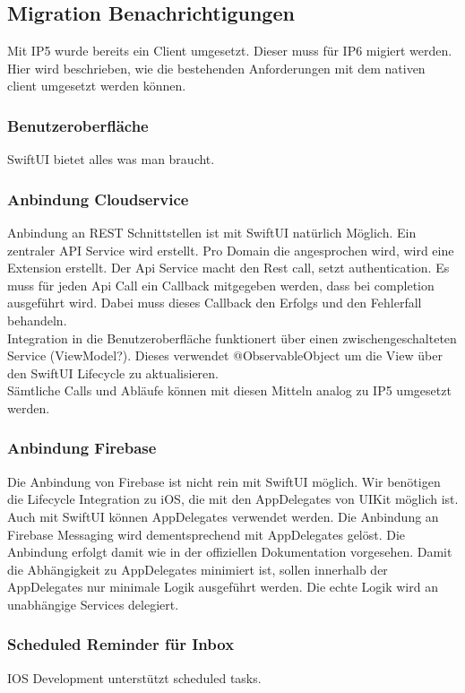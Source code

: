 \subsection{Migration Benachrichtigungen}

Mit IP5 wurde bereits ein Client umgesetzt.
Dieser muss für IP6 migiert werden.
Hier wird beschrieben, wie die bestehenden Anforderungen mit dem nativen client umgesetzt werden können.

\subsubsection*{Benutzeroberfläche}
SwiftUI bietet alles was man braucht.


\subsubsection*{Anbindung Cloudservice}
Anbindung an REST Schnittstellen ist mit SwiftUI natürlich Möglich.
Ein zentraler API Service wird erstellt.
Pro Domain die angesprochen wird, wird eine Extension erstellt.
Der Api Service macht den Rest call, setzt authentication.
Es muss für jeden Api Call ein Callback mitgegeben werden, dass bei completion ausgeführt wird.
Dabei muss dieses Callback den Erfolgs und den Fehlerfall behandeln. \\

Integration in die Benutzeroberfläche funktionert über einen zwischengeschalteten Service (ViewModel?).
Dieses verwendet @ObservableObject um die View über den SwiftUI Lifecycle zu aktualisieren. \\

Sämtliche Calls und Abläufe können mit diesen Mitteln analog zu IP5 umgesetzt werden.


\subsubsection*{Anbindung Firebase}

Die Anbindung von Firebase ist nicht rein mit SwiftUI möglich.
Wir benötigen die Lifecycle Integration zu iOS, die mit den AppDelegates von UIKit möglich ist.
Auch mit SwiftUI können AppDelegates verwendet werden.
Die Anbindung an Firebase Messaging wird dementsprechend mit AppDelegates gelöst.
Die Anbindung erfolgt damit wie in der offiziellen Dokumentation vorgesehen.
Damit die Abhängigkeit zu AppDelegates minimiert ist, sollen innerhalb der AppDelegates nur minimale Logik ausgeführt werden.
Die echte Logik wird an unabhängige Services delegiert.


\subsubsection*{Scheduled Reminder für Inbox}
IOS Development unterstützt scheduled tasks.

\clearpage
